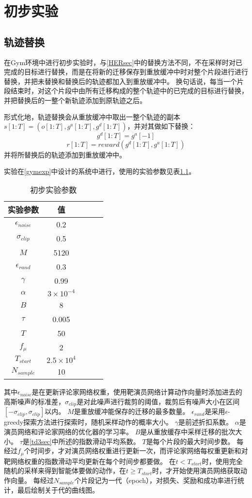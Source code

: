 \chapter{初步实验}

\section{轨迹替换}
在Gym环境中进行初步实验时，与\ref{HERsec}中的替换方法不同，不在采样时对已完成的目标进行替换，而是在将新的迁移保存到重放缓冲中时对整个片段进行进行替换，并把未替换和替换后的轨迹都加入到重放缓冲中。
换句话说，每当一个片段结束时，对这个片段中由所有迁移构成的整个轨迹中的已完成的目标进行替换，并把替换后的一整个新轨迹添加到原轨迹之后。

形式化地，轨迹替换会从重放缓冲中取出一整个轨迹的副本$s[1:T]=(o[1:T], g^a[1:T], g^d[1:T])$，并对其做如下替换：
$$g^d[1:T]=g^a[-1]$$
$$r[1:T]=reward(g^d[1:T], g^a[1:T])$$
并将所替换后的轨迹添加到重放缓冲中。

实验在\ref{gymexp}中设计的系统中进行，使用的实验参数见表\ref{pretable}。
    \begin{table}[htbp]
        \caption{初步实验参数}
        \label{pretable}
    \vspace{0.5em}\centering\wuhao
    \begin{tabular}{ccccc}
    \toprule[1.5pt]
    实验参数 & 值\\
    \midrule[1pt]
        $\epsilon_{noise}$ & 0.2\\
        $\sigma_{clip}$ & 0.5\\
        $M$ & 5120\\
        $\epsilon_{rand}$ & 0.3\\
        $\gamma$ & 0.99\\
        $\alpha$ & $3\times 10^{-4}$\\
        $B$ & 8\\
        $\tau$ & 0.005\\
        $T$ & 50\\
        $f_\mu$ & 2\\
        $T_{start}$ & $2.5\times 10^4$\\
        $N_{sample}$ & 10 \\
    \bottomrule[1.5pt]
    \end{tabular}
    \end{table}
    其中$\epsilon_{noise}$是在更新评论家网络权重，使用靶演员网络计算动作向量时添加进去的高斯噪声的标准差，$\sigma_{clip}$是对此噪声进行裁剪的阈值，裁剪后有噪声大小在区间$[-\sigma_{clip},\sigma_{clip}]$以内。
    $M$是重放缓冲能保存的迁移的最多数量。
    $\epsilon_{rand}$是采用$\epsilon$-greedy探索方法进行探索时，随机采样动作的概率大小。
    $\gamma$是前述折扣系数。
    $\alpha$是演员网络和评论家网络的优化器的学习率。
    $B$是从重放缓存中采样迁移的批次大小。
    $\tau$是\ref{td3sec}中所述的指数滑动平均系数。
    $T$是每个片段的最大时间步数。
    每经过$f_\mu$个时间步，才对演员网络权重进行更新一次，而评论家网络每权重更新和对靶网络权重的指数滑动平均更新在每个时间步都要做。
    在$t<T_{start}$时，使用完全随机的采样来得到智能体要做的动作，在$t\geq T_{start}$时，才开始使用演员网络获取动作向量。
    每经过$N_{sample}$个片段记为一代（epoch），对损失、奖励和成功率进行统计，最后绘制关于代的曲线图。

